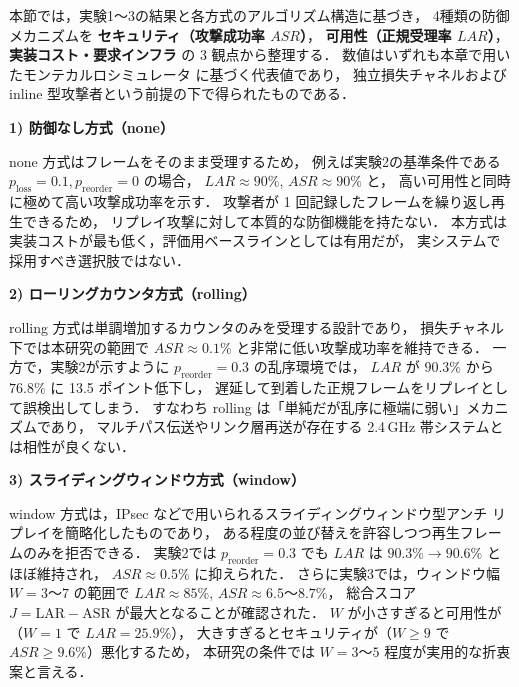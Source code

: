 \documentclass[twocolumn,10pt,a4paper]{jsarticle}
\begin{document}
\label{subsec:overall-comparison}

本節では，実験1～3の結果と各方式のアルゴリズム構造に基づき，
4種類の防御メカニズムを
\textbf{セキュリティ（攻撃成功率 $ASR$）}，
\textbf{可用性（正規受理率 $LAR$）}，
\textbf{実装コスト・要求インフラ}
の 3 観点から整理する．
数値はいずれも本章で用いたモンテカルロシミュレータ\cite{ReplaySimReadmeJP}
に基づく代表値であり，
独立損失チャネルおよび inline 型攻撃者という前提の下で得られたものである．

\vspace{1em}
\noindent\textbf{1) 防御なし方式（none）}\par
none 方式はフレームをそのまま受理するため，
例えば実験2の基準条件である $p_{\mathrm{loss}}=0.1, p_{\mathrm{reorder}}=0$ の場合，
$LAR \approx 90\%$, $ASR \approx 90\%$ と，
高い可用性と同時に極めて高い攻撃成功率を示す．
攻撃者が 1 回記録したフレームを繰り返し再生できるため，
リプレイ攻撃に対して本質的な防御機能を持たない．
本方式は実装コストが最も低く，評価用ベースラインとしては有用だが，
実システムで採用すべき選択肢ではない．

\vspace{1em}
\noindent\textbf{2) ローリングカウンタ方式（rolling）}\par
rolling 方式は単調増加するカウンタのみを受理する設計であり，
損失チャネル下では本研究の範囲で
$ASR \approx 0.1\%$ と非常に低い攻撃成功率を維持できる．
一方で，実験2が示すように $p_{\mathrm{reorder}}=0.3$ の乱序環境では，
$LAR$ が $90.3\%$ から $76.8\%$ に 13.5 ポイント低下し，
遅延して到着した正規フレームをリプレイとして誤検出してしまう．
すなわち rolling は「単純だが乱序に極端に弱い」メカニズムであり，
マルチパス伝送やリンク層再送が存在する 2.4\,GHz 帯システムとは相性が良くない．

\vspace{1em}
\noindent\textbf{3) スライディングウィンドウ方式（window）}\par
window 方式は，IPsec などで用いられるスライディングウィンドウ型アンチ
リプレイ\cite{rfc6479}を簡略化したものであり，
ある程度の並び替えを許容しつつ再生フレームのみを拒否できる．
実験2では $p_{\mathrm{reorder}}=0.3$ でも
$LAR$ は $90.3\%\rightarrow 90.6\%$ とほぼ維持され，
$ASR \approx 0.5\%$ に抑えられた．
さらに実験3では，ウィンドウ幅 $W=3$～$7$ の範囲で
$LAR \approx 85\%$, $ASR \approx 6.5$～$8.7\%$，
総合スコア $J = \mathrm{LAR} - \mathrm{ASR}$ が最大となることが確認された．
$W$ が小さすぎると可用性が（$W=1$ で $LAR=25.9\%$），
大きすぎるとセキュリティが（$W \ge 9$ で $ASR \ge 9.6\%$）悪化するため，
本研究の条件では $W=3$～$5$ 程度が実用的な折衷案と言える．
\end{document}
